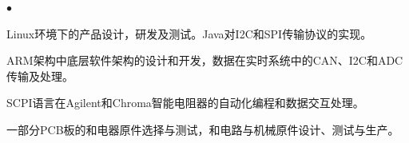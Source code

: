 \documentclass[UTF8]{ctexart}
\newenvironment{achievements}{
\begin{list}
        {$\bullet$}{\topsep 0pt
        \itemsep 0pt}}{\vspace*{4pt}
\end{list}
}
\begin{document}
\begin{achievements}
    \item  Linux环境下的产品设计，研发及测试。Java对I2C和SPI传输协议的实现。
    \item ARM架构中底层软件架构的设计和开发，数据在实时系统中的CAN、I2C和ADC传输及处理。
    \item	SCPI语言在Agilent和Chroma智能电阻器的自动化编程和数据交互处理。
    \item	一部分PCB板的和电器原件选择与测试，和电路与机械原件设计、测试与生产。
\end{achievements}
\end{document}
